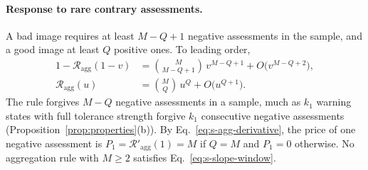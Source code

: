 \documentclass[10pt]{wlscirep}
\newcommand{\Rmap}{\mathscr{R}}            %
\newcommand{\Pone}{P_{1}}                  %
\theoremstyle{plain}
\theoremstyle{remark}
\begin{document}
\paragraph{Response to rare contrary assessments.} A bad image requires at least $M-Q+1$ negative assessments in the sample, and a good image at least $Q$ positive ones. To leading order,
\begin{equation}
\begin{aligned}
1-\Rmap_{\mathrm{agg}}(1-v)&=\binom{M}{M-Q+1}\,v^{M-Q+1}+O\bigl(v^{M-Q+2}\bigr),\\
\Rmap_{\mathrm{agg}}(u)&=\binom{M}{Q}\,u^{Q}+O\bigl(u^{Q+1}\bigr).
\end{aligned}
\label{eq:s-agg-limits}
\end{equation}
The rule forgives $M-Q$ negative assessments in a sample, much as $k_1$ warning states with full tolerance strength forgive $k_1$ consecutive negative assessments (Proposition~\ref{prop:properties}(b)). By Eq.~\eqref{eq:s-agg-derivative}, the price of one negative assessment is $\Pone=\Rmap'_{\mathrm{agg}}(1)=M$ if $Q=M$ and $\Pone=0$ otherwise. No aggregation rule with $M\geq2$ satisfies Eq.~\eqref{eq:s-slope-window}.
\end{document}
